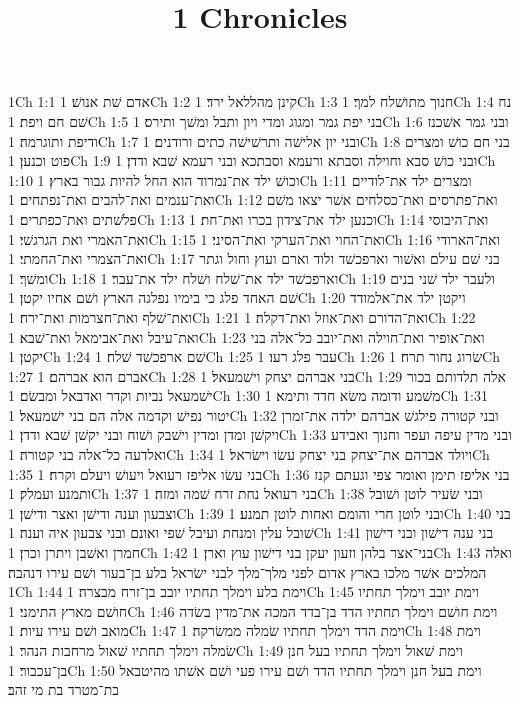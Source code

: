 

\title{1 Chronicles}

1Ch 1:1  אדם שׁת אנושׁ׃
1Ch 1:2  קינן מהללאל ירד׃
1Ch 1:3  חנוך מתושׁלח למך׃
1Ch 1:4  נח שׁם חם ויפת׃
1Ch 1:5  בני יפת גמר ומגוג ומדי ויון ותבל ומשׁך ותירס׃
1Ch 1:6  ובני גמר אשׁכנז ודיפת ותוגרמה׃
1Ch 1:7  ובני יון אלישׁה ותרשׁישׁה כתים ורודנים׃
1Ch 1:8  בני חם כושׁ ומצרים פוט וכנען׃
1Ch 1:9  ובני כושׁ סבא וחוילה וסבתא ורעמא וסבתכא ובני רעמא שׁבא ודדן׃
1Ch 1:10  וכושׁ ילד את־נמרוד הוא החל להיות גבור בארץ׃
1Ch 1:11  ומצרים ילד את־לודיים ואת־ענמים ואת־להבים ואת־נפתחים׃
1Ch 1:12  ואת־פתרסים ואת־כסלחים אשׁר יצאו משׁם פלשׁתים ואת־כפתרים׃
1Ch 1:13  וכנען ילד את־צידון בכרו ואת־חת׃
1Ch 1:14  ואת־היבוסי ואת־האמרי ואת הגרגשׁי׃
1Ch 1:15  ואת־החוי ואת־הערקי ואת־הסיני׃
1Ch 1:16  ואת־הארודי ואת־הצמרי ואת־החמתי׃
1Ch 1:17  בני שׁם עילם ואשׁור וארפכשׁד ולוד וארם ועוץ וחול וגתר ומשׁך׃
1Ch 1:18  וארפכשׁד ילד את־שׁלח ושׁלח ילד את־עבר׃
1Ch 1:19  ולעבר ילד שׁני בנים שׁם האחד פלג כי בימיו נפלגה הארץ ושׁם אחיו יקטן׃
1Ch 1:20  ויקטן ילד את־אלמודד ואת־שׁלף ואת־חצרמות ואת־ירח׃
1Ch 1:21  ואת־הדורם ואת־אוזל ואת־דקלה׃
1Ch 1:22  ואת־עיבל ואת־אבימאל ואת־שׁבא׃
1Ch 1:23  ואת־אופיר ואת־חוילה ואת־יובב כל־אלה בני יקטן׃
1Ch 1:24  שׁם ארפכשׁד שׁלח׃
1Ch 1:25  עבר פלג רעו׃
1Ch 1:26  שׂרוג נחור תרח׃
1Ch 1:27  אברם הוא אברהם׃
1Ch 1:28  בני אברהם יצחק וישׁמעאל׃
1Ch 1:29  אלה תלדותם בכור ישׁמעאל נביות וקדר ואדבאל ומבשׂם׃
1Ch 1:30  משׁמע ודומה משׂא חדד ותימא׃
1Ch 1:31  יטור נפישׁ וקדמה אלה הם בני ישׁמעאל׃
1Ch 1:32  ובני קטורה פילגשׁ אברהם ילדה את־זמרן ויקשׁן ומדן ומדין וישׁבק ושׁוח ובני יקשׁן שׁבא ודדן׃
1Ch 1:33  ובני מדין עיפה ועפר וחנוך ואבידע ואלדעה כל־אלה בני קטורה׃
1Ch 1:34  ויולד אברהם את־יצחק בני יצחק עשׂו וישׂראל׃
1Ch 1:35  בני עשׂו אליפז רעואל ויעושׁ ויעלם וקרח׃
1Ch 1:36  בני אליפז תימן ואומר צפי וגעתם קנז ותמנע ועמלק׃
1Ch 1:37  בני רעואל נחת זרח שׁמה ומזה׃
1Ch 1:38  ובני שׂעיר לוטן ושׁובל וצבעון וענה ודישׁן ואצר ודישׁן׃
1Ch 1:39  ובני לוטן חרי והומם ואחות לוטן תמנע׃
1Ch 1:40  בני שׁובל עלין ומנחת ועיבל שׁפי ואונם ובני צבעון איה וענה׃
1Ch 1:41  בני ענה דישׁון ובני דישׁון חמרן ואשׁבן ויתרן וכרן׃
1Ch 1:42  בני־אצר בלהן וזעון יעקן בני דישׁון עוץ וארן׃
1Ch 1:43  ואלה המלכים אשׁר מלכו בארץ אדום לפני מלך־מלך לבני ישׂראל בלע בן־בעור ושׁם עירו דנהבה׃
1Ch 1:44  וימת בלע וימלך תחתיו יובב בן־זרח מבצרה׃
1Ch 1:45  וימת יובב וימלך תחתיו חושׁם מארץ התימני׃
1Ch 1:46  וימת חושׁם וימלך תחתיו הדד בן־בדד המכה את־מדין בשׂדה מואב ושׁם עירו עיות׃
1Ch 1:47  וימת הדד וימלך תחתיו שׂמלה ממשׂרקה׃
1Ch 1:48  וימת שׂמלה וימלך תחתיו שׁאול מרחבות הנהר׃
1Ch 1:49  וימת שׁאול וימלך תחתיו בעל חנן בן־עכבור׃
1Ch 1:50  וימת בעל חנן וימלך תחתיו הדד ושׁם עירו פעי ושׁם אשׁתו מהיטבאל בת־מטרד בת מי זהב׃
